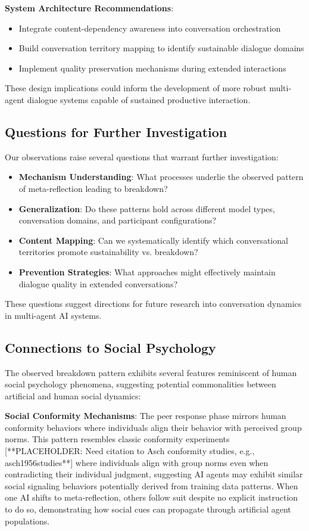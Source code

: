 \documentclass[11pt,letterpaper]{article}
\begin{document}
\textbf{System Architecture Recommendations}:
\begin{itemize}
    \item Integrate content-dependency awareness into conversation orchestration
    \item Build conversation territory mapping to identify sustainable dialogue domains
    \item Implement quality preservation mechanisms during extended interactions
\end{itemize}

These design implications could inform the development of more robust multi-agent dialogue systems capable of sustained productive interaction.

\subsection{Questions for Further Investigation}

Our observations raise several questions that warrant further investigation:

\begin{itemize}
    \item \textbf{Mechanism Understanding}: What processes underlie the observed pattern of meta-reflection leading to breakdown?
    \item \textbf{Generalization}: Do these patterns hold across different model types, conversation domains, and participant configurations?
    \item \textbf{Content Mapping}: Can we systematically identify which conversational territories promote sustainability vs. breakdown?
    \item \textbf{Prevention Strategies}: What approaches might effectively maintain dialogue quality in extended conversations?
\end{itemize}

These questions suggest directions for future research into conversation dynamics in multi-agent AI systems.

\subsection{Connections to Social Psychology}

The observed breakdown pattern exhibits several features reminiscent of human social psychology phenomena, suggesting potential commonalities between artificial and human social dynamics:

\textbf{Social Conformity Mechanisms}: The peer response phase mirrors human conformity behaviors where individuals align their behavior with perceived group norms. This pattern resembles classic conformity experiments [**PLACEHOLDER: Need citation to Asch conformity studies, e.g., asch1956studies**] where individuals align with group norms even when contradicting their individual judgment, suggesting AI agents may exhibit similar social signaling behaviors potentially derived from training data patterns. When one AI shifts to meta-reflection, others follow suit despite no explicit instruction to do so, demonstrating how social cues can propagate through artificial agent populations.
\end{document}
